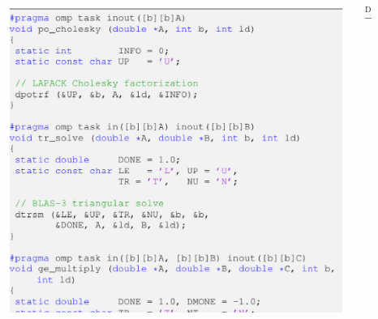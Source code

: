 \documentclass[10pt]{beamer}
\begin{document}
\begin{frame}[fragile]
 \begin{columns}[c]%
    \begin{column}{0.20\textwidth}
      \includegraphics[width=\columnwidth]{Figures/cholesky_tasks.eps}
    \end{column}
    \begin{column}{0.1\textwidth}
      $\xrightarrow{\text{DAG}}$
    \end{column}
    \begin{column}{0.20\textwidth}
      \begin{figure}[tbh!]
        \begin{center}

\end{center}
\end{figure}
\end{column}
\end{columns}
\end{frame}
\end{document}
